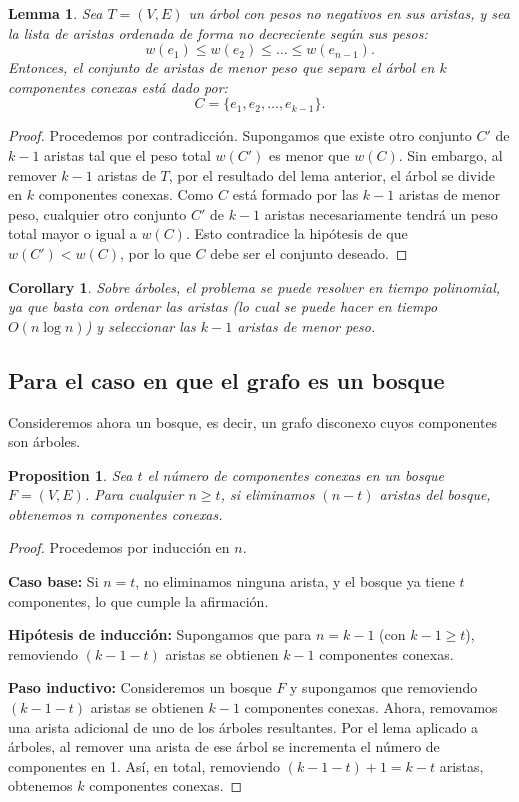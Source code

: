 \documentclass[12pt]{article}
\newtheorem{lemma}{Lemma}
\newtheorem{proposition}{Proposition}
\newtheorem{corollary}{Corollary}
\begin{document}
\begin{lemma}
Sea \( T = (V, E) \) un árbol con pesos no negativos en sus aristas, y sea la lista de aristas ordenada de forma no decreciente según sus pesos:
\[
w(e_1) \le w(e_2) \le \dots \le w(e_{n-1}).
\]
Entonces, el conjunto de aristas de menor peso que separa el árbol en \( k \) componentes conexas está dado por:
\[
C = \{ e_1, e_2, \dots, e_{k-1} \}.
\]
\end{lemma}

\begin{proof}
Procedemos por contradicción. Supongamos que existe otro conjunto \( C' \) de \( k-1 \) aristas tal que el peso total \( w(C') \) es menor que \( w(C) \).  
Sin embargo, al remover \( k-1 \) aristas de \( T \), por el resultado del lema anterior, el árbol se divide en \( k \) componentes conexas.  
Como \( C \) está formado por las \( k-1 \) aristas de menor peso, cualquier otro conjunto \( C' \) de \( k-1 \) aristas necesariamente tendrá un peso total mayor o igual a \( w(C) \).  
Esto contradice la hipótesis de que \( w(C') < w(C) \), por lo que \( C \) debe ser el conjunto deseado.
\end{proof}

\begin{corollary}
Sobre árboles, el problema se puede resolver en tiempo polinomial, ya que basta con ordenar las aristas (lo cual se puede hacer en tiempo \( O(n \log n) \)) y seleccionar las \( k-1 \) aristas de menor peso.
\end{corollary}

\subsection{Para el caso en que el grafo es un bosque}

Consideremos ahora un bosque, es decir, un grafo disconexo cuyos componentes son árboles.

\begin{proposition}
Sea \( t \) el número de componentes conexas en un bosque \( F = (V, E) \). Para cualquier \( n \ge t \), si eliminamos \( (n-t) \) aristas del bosque, obtenemos \( n \) componentes conexas.
\end{proposition}

\begin{proof}
Procedemos por inducción en \( n \).

\textbf{Caso base:}  
Si \( n = t \), no eliminamos ninguna arista, y el bosque ya tiene \( t \) componentes, lo que cumple la afirmación.

\textbf{Hipótesis de inducción:}  
Supongamos que para \( n = k-1 \) (con \( k-1 \ge t \)), removiendo \( (k-1 - t) \) aristas se obtienen \( k-1 \) componentes conexas.

\textbf{Paso inductivo:}  
Consideremos un bosque \( F \) y supongamos que removiendo \( (k-1-t) \) aristas se obtienen \( k-1 \) componentes conexas.  
Ahora, removamos una arista adicional de uno de los árboles resultantes. Por el lema aplicado a árboles, al remover una arista de ese árbol se incrementa el número de componentes en 1.  
Así, en total, removiendo \( (k-1-t) + 1 = k-t \) aristas, obtenemos \( k \) componentes conexas.  
\end{proof}
\end{document}
